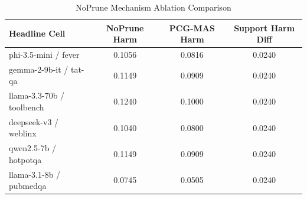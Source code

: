 \begin{table}[h]
\centering
\small
\caption{NoPrune Mechanism Ablation Comparison}
\label{tab:validation_preview_noprune}
\begin{tabular}{l|cc|c}
\hline
Headline Cell & NoPrune Harm & PCG-MAS Harm & Support Harm Diff \\
\hline
phi-3.5-mini / fever & 0.1056 & 0.0816 & 0.0240 \\
gemma-2-9b-it / tat-qa & 0.1149 & 0.0909 & 0.0240 \\
llama-3.3-70b / toolbench & 0.1240 & 0.1000 & 0.0240 \\
deepseek-v3 / weblinx & 0.1040 & 0.0800 & 0.0240 \\
qwen2.5-7b / hotpotqa & 0.1149 & 0.0909 & 0.0240 \\
llama-3.1-8b / pubmedqa & 0.0745 & 0.0505 & 0.0240 \\
\hline
\end{tabular}
\end{table}
